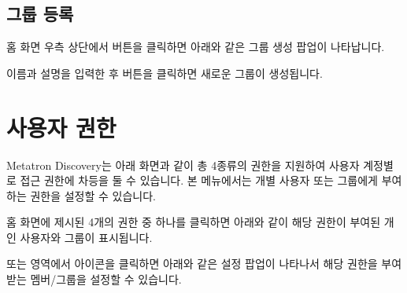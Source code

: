 \documentclass[letterpaper,10pt,english]{sphinxmanual}
\begin{document}
\subsection{그룹 등록}
\label{\detokenize{discovery/part08/groups:id4}}
홈 화면 우측 상단에서  버튼을 클릭하면 아래와 같은 그룹 생성 팝업이 나타납니다.
\begin{quote}

\begin{figure}[H]
\centering

\noindent{}
\end{figure}
\end{quote}

이름과 설명을 입력한 후  버튼을 클릭하면 새로운 그룹이 생성됩니다.


\section{사용자 권한}
\label{\detokenize{discovery/part08/permissions:id1}}\label{\detokenize{discovery/part08/permissions::doc}}
Metatron Discovery는 아래 화면과 같이 총 4종류의 권한을 지원하여 사용자 계정별로 접근 권한에 차등을 둘 수 있습니다. 본 메뉴에서는 개별 사용자 또는 그룹에게 부여하는 권한을 설정할 수 있습니다.
\begin{quote}

\begin{figure}[H]
\centering

\noindent{}
\end{figure}
\end{quote}

홈 화면에 제시된 4개의 권한 중 하나를 클릭하면 아래와 같이 해당 권한이 부여된 개인 사용자와 그룹이 표시됩니다.
\begin{quote}

\begin{figure}[H]
\centering

\noindent{}
\end{figure}
\end{quote}

 또는  영역에서  아이콘을 클릭하면 아래와 같은 설정 팝업이 나타나서 해당 권한을 부여받는 멤버/그룹을 설정할 수 있습니다.
\begin{quote}

\begin{figure}[H]
\centering

\noindent{}
\end{figure}
\end{quote}
\end{document}
